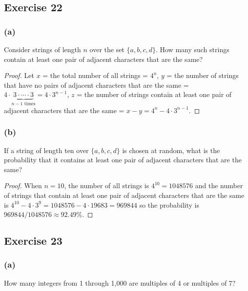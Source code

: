 \documentclass[14pt]{extarticle}
\begin{document}
\subsection{Exercise 22}
\subsubsection{(a)}
Consider strings of length $n$ over the set \(\{a, b, c, d\}\). How many such strings contain at least one pair of 
adjacent characters that are the same?

\begin{proof}
Let $x$ = the total number of all strings = \(4^n\), $y$ = the number of strings that have no pairs of adjacent characters 
that are the same = \(4 \cdot \underbrace{3 \cdot \cdots \cdot 3}_{n-1 \text{ times}} = 4 \cdot 3^{n-1}\), $z$ = the number 
of strings contain at least one pair of adjacent characters that are the same = \(x - y = 4^n - 4 \cdot 3^{n-1}\).
\end{proof}

\subsubsection{(b)}
If a string of length ten over \(\{a, b, c, d\}\) is chosen at random, what is the probability that it contains at 
least one pair of adjacent characters that are the same?

\begin{proof}
When $n=10$, the number of all strings is \(4^{10} = 1048576\) and the number of strings that contain at least 
one pair of adjacent characters that are the same is \(4^{10} - 4 \cdot 3^9 = 1048576 - 4 \cdot 19683 = 969844\)
so the probability is \(969844 / 1048576 \approx 92.49\%\).
\end{proof}

\subsection{Exercise 23}
\subsubsection{(a)}
How many integers from 1 through 1,000 are multiples of 4 or multiples of 7?
\end{document}
